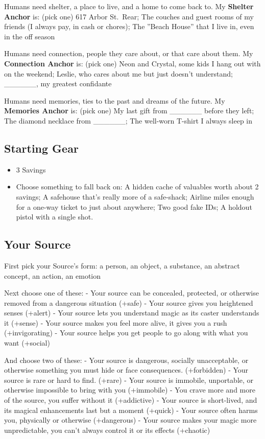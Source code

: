 \documentclass[
  oneside,
  statementpaper,
  9pt]{memoir}
\begin{document}
Humans need shelter, a place to live, and a home to come back to. My
\textbf{Shelter Anchor} is: (pick one) 617 Arbor St.~Rear; The couches
and guest rooms of my friends (I always pay, in cash or chores); The
''Beach House'' that I live in, even in the off season

Humans need connection, people they care about, or that care about them.
My \textbf{Connection Anchor} is: (pick one) Neon and Crystal, some kids
I hang out with on the weekend; Leslie, who cares about me but just
doesn't understand; \_\_\_\_\_\_, my greatest confidante

Humans need memories, ties to the past and dreams of the future. My
\textbf{Memories Anchor} is: (pick one) My last gift from \_\_\_\_\_\_
before they left; The diamond necklace from \_\_\_\_\_\_; The well-worn
T-shirt I always sleep in

\hypertarget{starting-gear-2}{%
\subsection{Starting Gear}\label{starting-gear-2}}

\begin{itemize}
\tightlist
\item
  3 Savings
\item
  Choose something to fall back on: A hidden cache of valuables worth
  about 2 savings; A safehouse that's really more of a safe-shack;
  Airline miles enough for a one-way ticket to just about anywhere; Two
  good fake IDs; A holdout pistol with a single shot.
\end{itemize}

\hypertarget{your-source}{%
\subsection{Your Source}\label{your-source}}

First pick your Source's form: a person, an object, a substance, an
abstract concept, an action, an emotion

Next choose one of these: - Your source can be concealed, protected, or
otherwise removed from a dangerous situation (+safe) - Your source gives
you heightened senses (+alert) - Your source lets you understand magic
as its caster understands it (+sense) - Your source makes you feel more
alive, it gives you a rush (+invigorating) - Your source helps you get
people to go along with what you want (+social)

And choose two of these: - Your source is dangerous, socially
unacceptable, or otherwise something you must hide or face consequences.
(+forbidden) - Your source is rare or hard to find. (+rare) - Your
source is immobile, unportable, or otherwise impossible to bring with
you (+immobile) - You crave more and more of the source, you suffer
without it (+addictive) - Your source is short-lived, and its magical
enhancements last but a moment (+quick) - Your source often harms you,
physically or otherwise (+dangerous) - Your source makes your magic more
unpredictable, you can't always control it or its effects (+chaotic)
\end{document}
